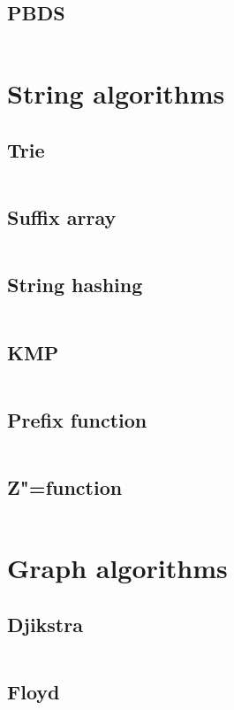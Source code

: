 ﻿\documentclass[10pt,twocolumn,oneside]{article}
\begin{document}
\subsection{PBDS}
\inputminted[breaklines]{cpp}{Data structures/pbds.cpp}

\section{String algorithms}
\subsection{Trie}
\inputminted[breaklines]{cpp}{String algorithms/trie.cpp}
\subsection{Suffix array}
\inputminted[breaklines]{cpp}{String algorithms/suffix array.cpp}
\subsection{String hashing}
\inputminted[breaklines]{cpp}{String algorithms/string hashing.cpp}
\subsection{KMP}
\inputminted[breaklines]{python}{String algorithms/kmp.py}
\subsection{Prefix function}
\inputminted[breaklines]{python}{String algorithms/prefix-function.py}
\subsection{Z"=function}
\inputminted[breaklines]{python}{String algorithms/z-function.py}

\section{Graph algorithms}
\subsection{Djikstra}
\inputminted[breaklines]{cpp}{Graph algorithms/djikstra.cpp}
\subsection{Floyd}
\inputminted[breaklines]{cpp}{Graph algorithms/floyd.cpp}
\end{document}
